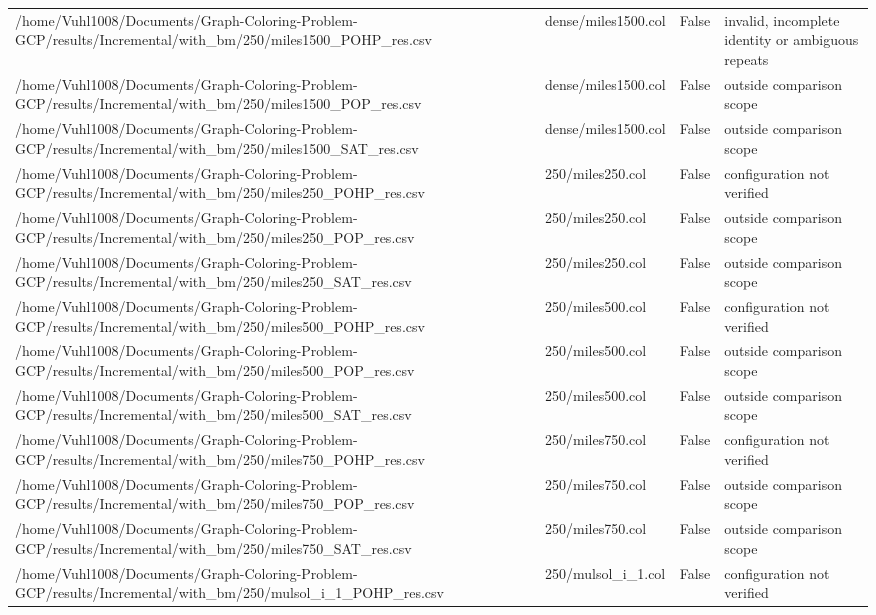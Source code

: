 \begin{table}[htbp]
\begin{tabular}{llll}
/home/Vuhl1008/Documents/Graph-Coloring-Problem-GCP/results/Incremental/with\_bm/250/miles1500\_POHP\_res.csv & dense/miles1500.col & False & invalid, incomplete identity or ambiguous repeats \\
/home/Vuhl1008/Documents/Graph-Coloring-Problem-GCP/results/Incremental/with\_bm/250/miles1500\_POP\_res.csv & dense/miles1500.col & False & outside comparison scope \\
/home/Vuhl1008/Documents/Graph-Coloring-Problem-GCP/results/Incremental/with\_bm/250/miles1500\_SAT\_res.csv & dense/miles1500.col & False & outside comparison scope \\
/home/Vuhl1008/Documents/Graph-Coloring-Problem-GCP/results/Incremental/with\_bm/250/miles250\_POHP\_res.csv & 250/miles250.col & False & configuration not verified \\
/home/Vuhl1008/Documents/Graph-Coloring-Problem-GCP/results/Incremental/with\_bm/250/miles250\_POP\_res.csv & 250/miles250.col & False & outside comparison scope \\
/home/Vuhl1008/Documents/Graph-Coloring-Problem-GCP/results/Incremental/with\_bm/250/miles250\_SAT\_res.csv & 250/miles250.col & False & outside comparison scope \\
/home/Vuhl1008/Documents/Graph-Coloring-Problem-GCP/results/Incremental/with\_bm/250/miles500\_POHP\_res.csv & 250/miles500.col & False & configuration not verified \\
/home/Vuhl1008/Documents/Graph-Coloring-Problem-GCP/results/Incremental/with\_bm/250/miles500\_POP\_res.csv & 250/miles500.col & False & outside comparison scope \\
/home/Vuhl1008/Documents/Graph-Coloring-Problem-GCP/results/Incremental/with\_bm/250/miles500\_SAT\_res.csv & 250/miles500.col & False & outside comparison scope \\
/home/Vuhl1008/Documents/Graph-Coloring-Problem-GCP/results/Incremental/with\_bm/250/miles750\_POHP\_res.csv & 250/miles750.col & False & configuration not verified \\
/home/Vuhl1008/Documents/Graph-Coloring-Problem-GCP/results/Incremental/with\_bm/250/miles750\_POP\_res.csv & 250/miles750.col & False & outside comparison scope \\
/home/Vuhl1008/Documents/Graph-Coloring-Problem-GCP/results/Incremental/with\_bm/250/miles750\_SAT\_res.csv & 250/miles750.col & False & outside comparison scope \\
/home/Vuhl1008/Documents/Graph-Coloring-Problem-GCP/results/Incremental/with\_bm/250/mulsol\_i\_1\_POHP\_res.csv & 250/mulsol\_i\_1.col & False & configuration not verified \\

\end{tabular}
\end{table}

